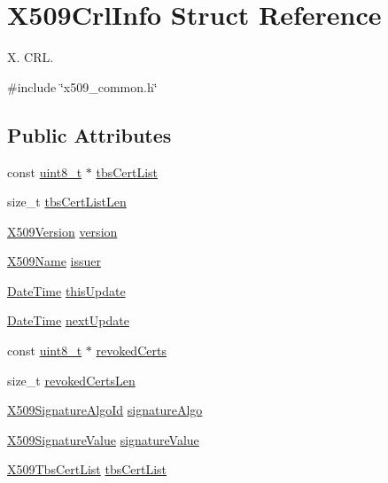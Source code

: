 \hypertarget{structX509CrlInfo}{}\section{X509\+Crl\+Info Struct Reference}
\label{structX509CrlInfo}


X. C\+RL.  




{\ttfamily \#include \char`\"{}x509\+\_\+common.\+h\char`\"{}}

\subsection*{Public Attributes}
\begin{DoxyCompactItemize}
\item 
const \hyperlink{stdint_8h_aba7bc1797add20fe3efdf37ced1182c5}{uint8\+\_\+t} $\ast$ \hyperlink{structX509CrlInfo_ae6ee6de5021634d8d20c25f7c44b768b}{tbs\+Cert\+List}
\item 
size\+\_\+t \hyperlink{structX509CrlInfo_a37f5b6aa82254acb88a5d87d316ca406}{tbs\+Cert\+List\+Len}
\item 
\hyperlink{certificate_2x509__common_8h_a42c631650a1a4fbe9d70d54d99dcac26}{X509\+Version} \hyperlink{structX509CrlInfo_a3eb1285124747734617d81bb7191f92f}{version}
\item 
\hyperlink{structX509Name}{X509\+Name} \hyperlink{structX509CrlInfo_a689dc1b40dfa9fd14d4942fd370c6d22}{issuer}
\item 
\hyperlink{structDateTime}{Date\+Time} \hyperlink{structX509CrlInfo_a8aac6bf90e1c3b7f06670a445efa2777}{this\+Update}
\item 
\hyperlink{structDateTime}{Date\+Time} \hyperlink{structX509CrlInfo_acedf40dfe16a6628ce18eeace2280c4f}{next\+Update}
\item 
const \hyperlink{stdint_8h_aba7bc1797add20fe3efdf37ced1182c5}{uint8\+\_\+t} $\ast$ \hyperlink{structX509CrlInfo_a9e68db2343336e30ba20c583e2ec507a}{revoked\+Certs}
\item 
size\+\_\+t \hyperlink{structX509CrlInfo_a674b4786e54fef82fbaac032ba29856d}{revoked\+Certs\+Len}
\item 
\hyperlink{structX509SignatureAlgoId}{X509\+Signature\+Algo\+Id} \hyperlink{structX509CrlInfo_a5e984222c3974ab1bae8062c6096efe1}{signature\+Algo}
\item 
\hyperlink{structX509SignatureValue}{X509\+Signature\+Value} \hyperlink{structX509CrlInfo_ae2badd150ecfe41d7f5004d271a107be}{signature\+Value}
\item 
\hyperlink{structX509TbsCertList}{X509\+Tbs\+Cert\+List} \hyperlink{structX509CrlInfo_af3c54fa0df425db38876f2a3e7637d55}{tbs\+Cert\+List}
\end{DoxyCompactItemize}


